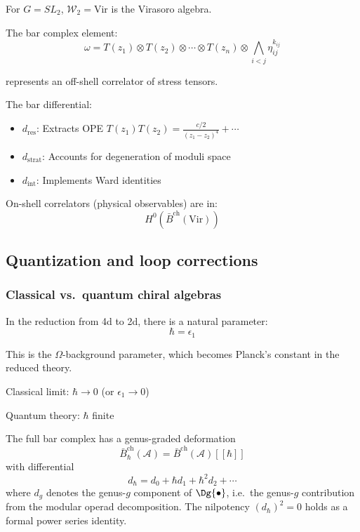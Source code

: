 \begin{example}[Virasoro = \texorpdfstring{$\mathcal{W}_2$}{W_2}]
For $G = SL_2$, $\mathcal{W}_2 = \text{Vir}$ is the Virasoro algebra.

The bar complex element:
\[\omega = T(z_1) \otimes T(z_2) \otimes \cdots \otimes T(z_n) \otimes
\bigwedge_{i<j} \eta_{ij}^{k_{ij}}\]

represents an off-shell correlator of stress tensors.

The bar differential:
\begin{itemize}
\item $d_{\text{res}}$: Extracts OPE $T(z_1)T(z_2) = \frac{c/2}{(z_1-z_2)^4} + \cdots$
\item $d_{\text{strat}}$: Accounts for degeneration of moduli space
\item $d_{\text{int}}$: Implements Ward identities
\end{itemize}

On-shell correlators (physical observables) are in:
\[H^0(\bar{B}^{\text{ch}}(\text{Vir}))\]
\end{example}

\subsection{Quantization and loop corrections}

\subsubsection{Classical vs.\ quantum chiral algebras}

\begin{definition}
In the reduction from 4d to 2d, there is a natural parameter:
\[\hbar = \epsilon_1\]

This is the $\Omega$-background parameter, which becomes Planck's constant in
the reduced theory.

Classical limit: $\hbar \to 0$ (or $\epsilon_1 \to 0$)

Quantum theory: $\hbar$ finite
\end{definition}

\begin{theorem}
\label{thm:genus-graded-bar}
The full bar complex has a genus-graded deformation
\[\bar{B}^{\mathrm{ch}}_\hbar(\mathcal{A}) = \bar{B}^{\mathrm{ch}}(\mathcal{A})[[\hbar]]\]
with differential
\[d_\hbar = d_0 + \hbar d_1 + \hbar^2 d_2 + \cdots\]
where $d_g$ denotes the genus-$g$ component of $\Dg{\bullet}$, i.e.\ the genus-$g$ contribution from the modular operad decomposition.
The nilpotency $(d_\hbar)^2 = 0$ holds as a formal power series identity.
\end{theorem}

